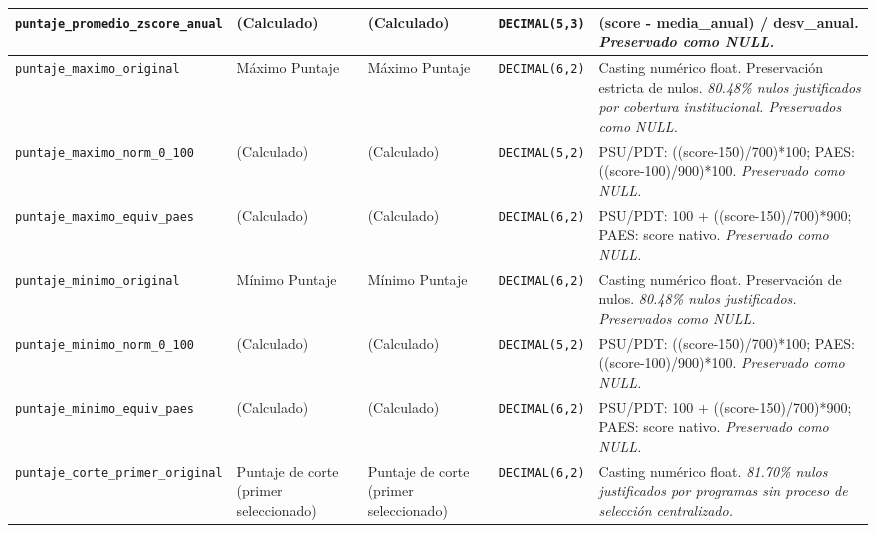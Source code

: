 {\begin{longtable}{|p{3.0cm}|p{2.0cm}|p{2.0cm}|p{1.6cm}|p{6.4cm}|}
\hline
\texttt{\footnotesize puntaje\_promedio\_zscore\_anual} & (Calculado) & (Calculado) & \texttt{\footnotesize DECIMAL(5,3)} & (score - media\_anual) / desv\_anual. \newline \textit{\footnotesize Preservado como NULL.} \\
\hline
\texttt{\footnotesize puntaje\_maximo\_original} & Máximo Puntaje & Máximo Puntaje & \texttt{\footnotesize DECIMAL(6,2)} & Casting numérico float. Preservación estricta de nulos. \newline \textit{\footnotesize 80.48\% nulos justificados por cobertura institucional. Preservados como NULL.} \\
\hline
\texttt{\footnotesize puntaje\_maximo\_norm\_0\_100} & (Calculado) & (Calculado) & \texttt{\footnotesize DECIMAL(5,2)} & PSU/PDT: ((score-150)/700)*100; PAES: ((score-100)/900)*100. \newline \textit{\footnotesize Preservado como NULL.} \\
\hline
\texttt{\footnotesize puntaje\_maximo\_equiv\_paes} & (Calculado) & (Calculado) & \texttt{\footnotesize DECIMAL(6,2)} & PSU/PDT: 100 + ((score-150)/700)*900; PAES: score nativo. \newline \textit{\footnotesize Preservado como NULL.} \\
\hline
\texttt{\footnotesize puntaje\_minimo\_original} & Mínimo Puntaje & Mínimo Puntaje & \texttt{\footnotesize DECIMAL(6,2)} & Casting numérico float. Preservación de nulos. \newline \textit{\footnotesize 80.48\% nulos justificados. Preservados como NULL.} \\
\hline
\texttt{\footnotesize puntaje\_minimo\_norm\_0\_100} & (Calculado) & (Calculado) & \texttt{\footnotesize DECIMAL(5,2)} & PSU/PDT: ((score-150)/700)*100; PAES: ((score-100)/900)*100. \newline \textit{\footnotesize Preservado como NULL.} \\
\hline
\texttt{\footnotesize puntaje\_minimo\_equiv\_paes} & (Calculado) & (Calculado) & \texttt{\footnotesize DECIMAL(6,2)} & PSU/PDT: 100 + ((score-150)/700)*900; PAES: score nativo. \newline \textit{\footnotesize Preservado como NULL.} \\
\hline
\texttt{\footnotesize puntaje\_corte\_primer\_original} & Puntaje de corte (primer seleccionado) & Puntaje de corte (primer seleccionado) & \texttt{\footnotesize DECIMAL(6,2)} & Casting numérico float. \newline \textit{\footnotesize 81.70\% nulos justificados por programas sin proceso de selección centralizado.} \\

\end{longtable}}
